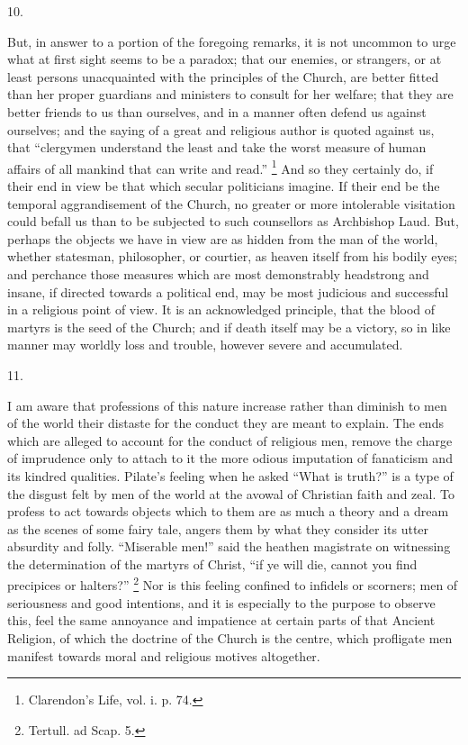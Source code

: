 10.

But, in answer to a portion of the foregoing remarks, it is not
uncommon to urge what at first sight seems to be a paradox; that our
enemies, or strangers, or at least persons unacquainted with the
principles of the Church, are better fitted than her proper guardians
and ministers to consult for her welfare; that they are better
friends to us than ourselves, and in a manner often defend us against
ourselves; and the saying of a great and religious author is quoted
against us, that ``clergymen understand the least and take the
worst measure of human affairs of all mankind that can write and
read.'' \footnote{Clarendon's Life, vol. i. p. 74.} And so they
certainly do, if their end in view be that which secular politicians
imagine. If their end be the temporal aggrandisement of the Church, no
greater or more intolerable visitation could befall us than to be
subjected to such counsellors as Archbishop Laud. But, perhaps the
objects we have in view are as hidden from the man of the world,
whether statesman, philosopher, or courtier, as heaven itself from his
bodily eyes; and perchance those measures which are most demonstrably
headstrong and insane, if directed towards a political end, may be
most judicious and successful in a religious point of view. It is an
acknowledged principle, that the blood of martyrs is the seed of the
Church; and if death itself may be a victory, so in like manner may
worldly loss and trouble, however severe and accumulated.

11.

I am aware that professions of this nature increase rather than
diminish to men of the world their distaste for the conduct they are
meant to explain. The ends which are alleged to account for the
conduct of religious men, remove the charge of imprudence only to
attach to it the more odious imputation of fanaticism and its kindred
qualities. Pilate's feeling when he asked ``What is truth?''
is a type of the disgust felt by men of the world at the avowal of
Christian faith and zeal. To profess to act towards objects which to
them are as much a theory and a dream as the scenes of some fairy
tale, angers them by what they consider its utter absurdity and folly.
``Miserable men!'' said the heathen magistrate on
witnessing the determination of the martyrs of Christ, ``if ye
will die, cannot you find precipices or halters?'' \footnote{Tertull. ad Scap. 5.} Nor is this feeling confined to infidels or scorners; men of
seriousness and good intentions, and it is especially to the purpose
to observe this, feel the same annoyance and impatience at certain
parts of that Ancient Religion, of which the doctrine of the Church is
the centre, which profligate men manifest towards moral and religious
motives altogether.

